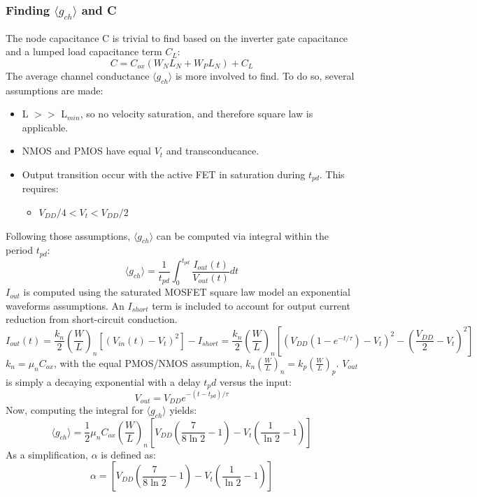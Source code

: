 \documentclass[10pt,a4paper]{article}
\begin{document}
	\subsubsection{Finding $\langle g_{ch}\rangle$ and C}
	The node capacitance C is trivial to find based on the inverter gate capacitance and a lumped load capacitance term $C_L$:
	\begin{equation}
		C = C_{ox}\left ( W_N L_N + W_P L_N \right) + C_L
	\end{equation}
	The average channel conductance $\langle g_{ch} \rangle$ is more involved to find. To do so, several assumptions are made:
	\begin{itemize}
		\item L $>>$ L$_{min}$, so no velocity saturation, and therefore square law is applicable.
		\item NMOS and PMOS have equal $V_t$ and transconducance.
		\item Output transition occur with the active FET in saturation during $t_{pd}$. This requires:
		\begin{itemize}
			\item $V_{DD}/4 < V_{t} < V_{DD}/2$
		\end{itemize}
	\end{itemize}
	Following those assumptions, $\langle g_{ch} \rangle$ can be computed via integral within the period $t_{pd}$:
	\begin{equation}
		\langle g_{ch} \rangle = \frac{1}{t_{pd}} \int_0^{t_{pd}}\frac{I_{out}(t)}{V_{out}(t)}dt
	\end{equation}
	$I_{out}$ is computed using the saturated MOSFET square law model an exponential waveforms assumptions. An $I_{short}$ term is included to account for output current reduction from short-circuit conduction.
	\begin{equation}
	I_{out}(t) = \frac{k_n}{2}\left(\frac{W}{L}\right)_n\left[\left(V_{in}(t) - V_t\right)^2 \right]  - I_{short} = \frac{k_n}{2}\left(\frac{W}{L}\right)_n\left[\left(V_{DD}\left(1-e^{-t/\tau}\right) - V_t\right)^2 - \left(\frac{V_{DD}}{2} -V_t\right)^2\right]
	\end{equation}
	$k_n = \mu_nC_{ox}$, with the equal PMOS/NMOS assumption, $k_n\left(\frac{W}{L}\right)_n=k_p\left(\frac{W}{L}\right)_p$. $V_{out}$ is simply a decaying exponential with a delay $t_pd$ versus the input:
	\begin{equation}
	V_{out} = V_{DD}e^{-(t-t_{pd})/\tau}
	\end{equation}
	Now, computing the integral for $\langle g_{ch} \rangle$ yields:
	\begin{equation}
		\langle g_{ch} \rangle = \frac{1}{2}\mu_nC_{ox}\left(\frac{W}{L}\right)_n\left[V_{DD}\left(\frac{7}{8\ln2}-1\right)-V_t\left(\frac{1}{\ln2}-1\right) \right]
	\end{equation}
	As a simplification, $\alpha$ is defined as:
	\begin{equation}
		\alpha = \left[V_{DD}\left(\frac{7}{8\ln2}-1\right)-V_t\left(\frac{1}{\ln2}-1\right) \right]
	\end{equation}	
\end{document}
